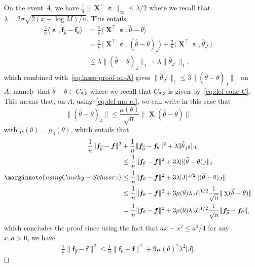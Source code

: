 \documentclass[
	fontsize=11pt, %
	twoside=false, %
	numbers=noenddot, %
]{kaobook}
\DeclareMathOperator{\bX}{{\boldsymbol X}}
\renewcommand{\bf}{{\boldsymbol f}}
\DeclareMathOperator{\beps}{\boldsymbol \varepsilon}
\newcommand{\wh}{\widehat}
\newcommand{\norm}[1]{\| #1 \|}
\newcommand{\inr}[1]{\langle #1 \rangle}
\begin{document}
On the event $A$,%
we have $\frac 1n \norm{\bX^\top \beps}_\infty \leq \lambda / 2$ where we recall that $\lambda = 2 \sigma \sqrt{2 (x + \log M) / n}$.
This entails 
\begin{align*}
	\frac 2n \inr{\beps,  \bf_{\wh \theta} - \bf_\theta} &=
	\frac 2n \inr{\bX^\top \beps, \wh \theta - \theta} \\
	&= \frac 2n \inr{\bX^\top \beps, (\wh \theta - \theta)_J} 
	+ \frac 2n \inr{\bX^\top \beps, \wh \theta_{J^\complement}} \\
	&\leq \lambda \norm{(\wh \theta - \theta)_J}_1 
	+ \lambda \norm{\wh \theta_{J^\complement}}_1,
\end{align*}
which combined with~\eqref{eq:lasso-proof-on-A} gives $\norm{\wh \theta_{J^\complement}}_1 \leq 3 \norm{(\wh \theta - \theta)_J}_1$ on $A$, 
namely that $\wh \theta - \theta \in C_{\theta, 3}$ where we recall that $C_{\theta, 3}$ is given by~\eqref{eq:def-cone-C}.
This means that, on $A$, using~\eqref{eq:def-mu-re}, we can write in this case that
\begin{equation*}
	\norm{(\wh \theta - \theta)_J} \leq \frac{\mu(\theta)}{\sqrt n} \norm{\bX (\wh \theta - \theta)}
\end{equation*}
with $\mu(\theta) = \mu_3(\theta)$, which entails that
\begin{align*}
	\frac 1n \norm{\bf_{\wh \theta} - \bf}^2 
	&+ \frac 1n \norm{\bf_{\wh \theta} - \bf_{\theta}}^2
	+ \lambda \norm{\wh \theta_{J^\complement}}_1 \\
	&\leq \frac 1n \norm{\bf_{\theta} - \bf}^2 
	+ 3 \lambda \norm{(\wh \theta - \theta)_J}_1 \\
	\marginnote{using Cauchy-Schwarz}
	&\leq \frac 1n \norm{\bf_{\theta} - \bf}^2 + 3 \lambda |J|^{1/2} \norm{(\wh \theta - \theta)_J} \\
	&\leq \frac 1n \norm{\bf_{\theta} - \bf}^2 + 3 \mu(\theta) \lambda |J|^{1/2} 
	\frac{1}{\sqrt n} \norm{\bX (\wh \theta - \theta)} \\
	&= \frac 1n \norm{\bf_{\theta} - \bf}^2 + 3 \mu(\theta) \lambda |J|^{1/2} 
	\frac{1}{\sqrt n} \norm{\bf_{\wh \theta} - \bf_\theta},
\end{align*}
which concludes the proof since using the fact that $ax - x^2 \leq a^2 / 4$ for any $x, a > 0$, we have
\begin{align*}
	\frac 1n \norm{\bf_{\wh \theta} - \bf}^2 
	\leq \frac 1n \norm{\bf_{\theta} - \bf}^2 + 9 \mu(\theta)^2 \lambda^2 |J|.
\end{align*}
$\hfill \square$
\end{document}
